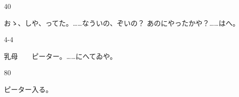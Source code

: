 \documentclass[tate,paper=b6j,jafontsize=9pt]{jlreq}
\begin{document}
\begin{azconvIndented}{4\zw}{0\zw}

おゝ、しや、ってた。……なういの、ぞいの？ あのにやったかや？……はへ。

\end{azconvIndented}
\begin{azconvIndented}{4\zw}{-4\zw}

乳母　　ピーター。……にへてゐや。

\end{azconvIndented}
\begin{azconvIndented}{8\zw}{0\zw}

ピーター入る。

\end{azconvIndented}
\end{document}

